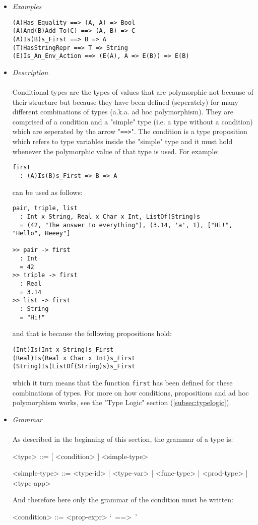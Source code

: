 \documentclass{article}
\begin{document}
\begin{itemize}
\item \textit{Examples}
\begin{verbatim}
(A)Has_Equality ==> (A, A) => Bool
(A)And(B)Add_To(C) ==> (A, B) => C
(A)Is(B)s_First ==> B => A
(T)HasStringRepr ==> T => String
(E)Is_An_Env_Action ==> (E(A), A => E(B)) => E(B)
\end{verbatim}

\item \textit{Description} \\\\
Conditional types are the types of values that are polymorphic not because of
their structure but because they have been defined (seperately) for many
different combinations of types (a.k.a. ad hoc polymorphism). They are
comprised of a condition and a "simple" type (i.e. a type without a
condition) which are seperated by the arrow "\texttt{==>}". The condition is a
type proposition which refers to type variables inside the "simple" type
and it must hold whenever the polymorphic value of that type is used. For
example:
\begin{verbatim}
first
  : (A)Is(B)s_First => B => A
\end{verbatim}
can be used as follows:
\begin{verbatim}
pair, triple, list
  : Int x String, Real x Char x Int, ListOf(String)s
  = (42, "The answer to everything"), (3.14, 'a', 1), ["Hi!", "Hello", Heeey"]

>> pair -> first
  : Int
  = 42
>> triple -> first
  : Real
  = 3.14
>> list -> first
  : String
  = "Hi!"
\end{verbatim}
and that is because the following propositions hold:
\begin{verbatim}
(Int)Is(Int x String)s_First
(Real)Is(Real x Char x Int)s_First
(String)Is(ListOf(String)s)s_First
\end{verbatim}
which it turn means that the function \texttt{first} has been defined
for these combinations of types. For more on how conditions, propositions and
ad hoc polymorphism works, see the "Type Logic" section (\ref{subsec:typelogic}).

\item \textit{Grammar}\\\\
As described in the beginning of this section, the grammar of a type is:
\begin{grammar}
<type> ::= [ <condition> ]  <simple-type> 

<simple-type> ::= <type-id> | <type-var> | <func-type> | <prod-type> | <type-app>
\end{grammar}
And therefore here only the grammar of the condition must be written:
\begin{grammar}
<condition> ::= <prop-expr> `\ ==>\ ' 
\end{grammar}
\end{itemize}
\end{document}
